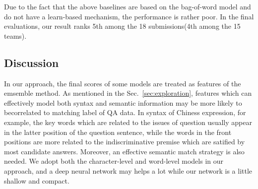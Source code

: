 \documentclass{llncs}
\begin{document}
Due to the fact that the above baselines are based on the bag-of-word model and do not have a learn-based mechanism, the performance is rather poor. In the final evaluations, our result ranks 5th among the 18 submissions(4th among the 15 teams).

\subsection{Discussion}
\label{discussion}

In our approach, the final scores of some models are treated as features of the emsemble method. As mentioned in the Sec.~\ref{sec:exploration}, features which can effectively model both syntax and semantic information may be more likely {\color{red}to be}correlated to matching label of QA data. In syntax of Chiness {\color{red}expression}, for example, the key words which are related to the issues of question usually {\color{red}appear} in the latter position of the question sentence, while the words in the front positions are more related to the indiscriminative premise which are satified by most candidate answers. Moreover, {\color{red}an} effective semantic match strategy is also needed. We adopt both the character-level and word-level models in our approach, and a deep neural network may helps a lot while our network is a little shallow and compact.
\end{document}
